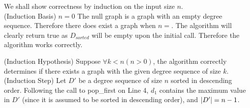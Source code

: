 \documentclass[12pt]{article}
\newenvironment{lemma}[2][Lemma]{\begin{trivlist}
\item[\hskip \labelsep {\bfseries #1}\hskip \labelsep {\bfseries #2.}]}{\end{trivlist}}
\newenvironment{question}[2][Question]{\begin{trivlist}
\item[\hskip \labelsep {\bfseries #1}\hskip \labelsep {\bfseries #2.}]}{\end{trivlist}}
\DeclarePairedDelimiter\abs{\lvert}{\rvert}%
\begin{document}
\begin{question}{3 (c)}
\begin{lemma}{3.1}
    We shall show correctness by induction on the input size $n$. \\

    (Induction Basis) $n = 0$ The null graph is a graph with an empty degree sequence.
    Therefore there does exist a graph when $n = $.  The algorithm will clearly
    return true as $D_{sorted}$ will be empty upon the initial call.  Therefore
    the algorithm works correctly. \\

    \pagebreak

    (Induction Hypothesis) Suppose $\forall k < n (n > 0)$, the algorithm correctly
    determines if there exists a graph with the given degree sequence of size $k$. \\

    (Induction Step) Let $D'$ be a degree sequence of size $n$ sorted in descending order.  Following
    the call to pop\_first on Line 4, $d_{1}$ contains the maximum value in $D'$ (since it is assumed to
    be sorted in descending order), and $\abs{D'} = n - 1$.
  \end{lemma}
\end{question}
\end{document}

